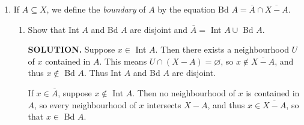 \documentclass{article}
\begin{document}
\begin{enumerate}
    $\overline{D} = D \cup (0, 1] \times \{0\} \cup [0, 1) \times \{1\}$. Consider any $s \in (0, 1]$ and let $U = (a \times b, c \times d)$ be a basis element containing $s \times 0$, so that $0 \leq a < s$. Let $p$ be such that $0 \leq a < p < s$, and thus $p \times \frac12 \in U \cap D$ shows that $(0, 1] \times \{0\} \subseteq \overline{D}$. Similarly, for any $t \in [0, 1)$ and any $V = (a \times b, c\times d)$ containing $t \times 1$, $t < c \leq 1,$ so there exists $q$ with $t < q < c \leq 1$, and $q \times \frac12 \in V \cap D$ shows that $[0, 1) \times \{1\} \subseteq \overline{D}$. To show that every other point is not in $\overline{D}$, it suffices to consider the neighbourhoods $[0 \times 0, 0 \times 1)$ of $0 \times 0$, $(1 \times 0, 1\times 1]$ of $1\times 1$, $(x \times 0, x \times \frac12)$ of $x \times y$ with $0 < y < \frac12$, and $(x \times \frac12, x \times 1)$ of $x \times y$ with $1 > y > \frac12$.

    $\overline{E} = [\frac12 \times 0, \frac12 \times 1]$. Consider any basis element $U = (a \times b, c \times d)$ containing $\frac12 \times 0$, and let $p$ be such that $0 < p < d$. Then $\frac12 \times p \in U \cap E$, so that $\frac12 \times 0 \in \overline{E}$. Similarly, consider any $V = (e \times f, g \times h)$ containing $\frac12 \times 1$; there exists $q $ with $f < q < 1$, and thus $\frac12 \times q \in V \cap E$, showing that $\frac12 \times 1 \in \overline{E}$. If $x \in [0, \frac12)$ and $y\in [0, 1]$, then $[0 \times 0, \frac12 \times 0)$ is a neighbourhood of $x \times y$ disjoint from $E$, and otherwise if $x\in (\frac12, 1]$, then $(\frac12 \times 1, 1 \times 1]$ is such a neighbourhood. $\Box$
    
    \item If $A \subseteq X$, we define the {\it boundary} of $A$ by the equation Bd $A = \overline{A} \cap \overline{X-A}$.
        \begin{enumerate}
            \item Show that Int $A$ and Bd $A$ are disjoint and $\overline{A} = $ Int $A \cup $ Bd $A$.

            {\bf SOLUTION.} Suppose $x \in $ Int $A.$ Then there exists a neighbourhood $U$ of $x$ contained in $A$. This means $U \cap (X-A) = \varnothing$, so $x \notin \overline{X-A}$, and thus $x \notin$ Bd $A$. Thus Int $A$ and Bd $A$ are disjoint.

            If $x \in \overline{A}$, suppose $x \notin$ Int $A$. Then no neighbourhood of $x$ is contained in $A$, so every neighbourhood of $x$ intersects $X-A$, and thus $x \in \overline{X-A}$, so that $x \in$ Bd $A$.


\end{enumerate}
\end{enumerate}
\end{document}
